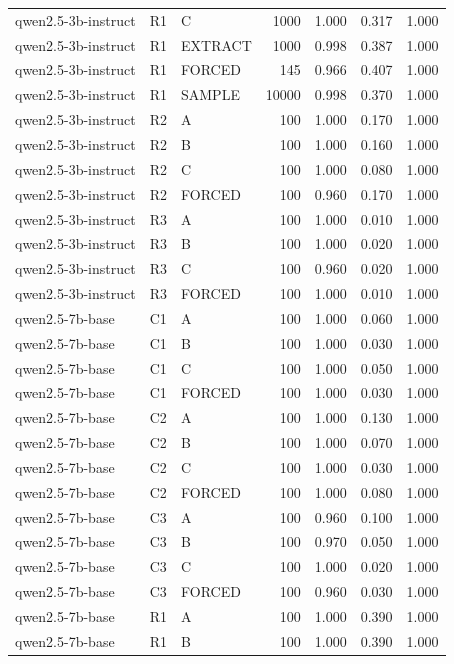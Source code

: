 \begin{table}
\begin{tabular}{lllrrrr}
qwen2.5-3b-instruct & R1 & C & 1000 & 1.000 & 0.317 & 1.000 \\
qwen2.5-3b-instruct & R1 & EXTRACT & 1000 & 0.998 & 0.387 & 1.000 \\
qwen2.5-3b-instruct & R1 & FORCED & 145 & 0.966 & 0.407 & 1.000 \\
qwen2.5-3b-instruct & R1 & SAMPLE & 10000 & 0.998 & 0.370 & 1.000 \\
qwen2.5-3b-instruct & R2 & A & 100 & 1.000 & 0.170 & 1.000 \\
qwen2.5-3b-instruct & R2 & B & 100 & 1.000 & 0.160 & 1.000 \\
qwen2.5-3b-instruct & R2 & C & 100 & 1.000 & 0.080 & 1.000 \\
qwen2.5-3b-instruct & R2 & FORCED & 100 & 0.960 & 0.170 & 1.000 \\
qwen2.5-3b-instruct & R3 & A & 100 & 1.000 & 0.010 & 1.000 \\
qwen2.5-3b-instruct & R3 & B & 100 & 1.000 & 0.020 & 1.000 \\
qwen2.5-3b-instruct & R3 & C & 100 & 0.960 & 0.020 & 1.000 \\
qwen2.5-3b-instruct & R3 & FORCED & 100 & 1.000 & 0.010 & 1.000 \\
qwen2.5-7b-base & C1 & A & 100 & 1.000 & 0.060 & 1.000 \\
qwen2.5-7b-base & C1 & B & 100 & 1.000 & 0.030 & 1.000 \\
qwen2.5-7b-base & C1 & C & 100 & 1.000 & 0.050 & 1.000 \\
qwen2.5-7b-base & C1 & FORCED & 100 & 1.000 & 0.030 & 1.000 \\
qwen2.5-7b-base & C2 & A & 100 & 1.000 & 0.130 & 1.000 \\
qwen2.5-7b-base & C2 & B & 100 & 1.000 & 0.070 & 1.000 \\
qwen2.5-7b-base & C2 & C & 100 & 1.000 & 0.030 & 1.000 \\
qwen2.5-7b-base & C2 & FORCED & 100 & 1.000 & 0.080 & 1.000 \\
qwen2.5-7b-base & C3 & A & 100 & 0.960 & 0.100 & 1.000 \\
qwen2.5-7b-base & C3 & B & 100 & 0.970 & 0.050 & 1.000 \\
qwen2.5-7b-base & C3 & C & 100 & 1.000 & 0.020 & 1.000 \\
qwen2.5-7b-base & C3 & FORCED & 100 & 0.960 & 0.030 & 1.000 \\
qwen2.5-7b-base & R1 & A & 100 & 1.000 & 0.390 & 1.000 \\
qwen2.5-7b-base & R1 & B & 100 & 1.000 & 0.390 & 1.000 \\

\end{tabular}
\end{table}
